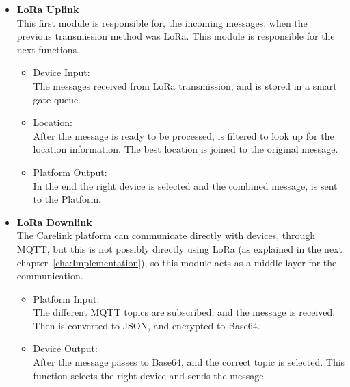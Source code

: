 \begin{itemize}
\label{susec:Lora_to_Platform}
   \item \textbf{LoRa Uplink} \\
   This first module is responsible for, the incoming messages. when the previous transmission method was LoRa. This module is responsible for the  next functions.
   \begin{itemize}
     \item Device Input: \\
      The messages received from LoRa transmission, and is stored in a smart gate  queue.
   \end{itemize}
   \begin{itemize}
     \item Location: \\
      After the message is ready to be processed, is filtered to look up for the location information. The best location is joined to the original message.
   \end{itemize}
   \begin{itemize}
     \item Platform Output: \\
      In the end the right device is selected and  the combined message, is sent to the Platform.
   \end{itemize}
\end{itemize}


\begin{itemize}
   \item \textbf{LoRa Downlink} \\
   The Carelink platform can communicate directly with devices, through MQTT, but this is not possibly directly using LoRa (as explained in the next chapter~\ref{cha:Implementation}), so this module acts as a middle layer for the communication. 
   \begin{itemize}
     \item Platform Input:\\ 
     The different MQTT topics are subscribed, and the message is received. Then is converted to JSON, and encrypted to Base64.
   \end{itemize}
   \begin{itemize}
     \item Device Output: \\
     After the message passes to Base64, and the correct topic is selected. This function selects the right device and sends the message.
   \end{itemize}
\end{itemize}


